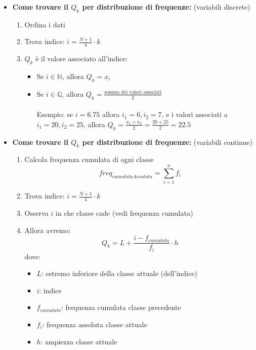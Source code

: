 \documentclass{article}  %
\theoremstyle{definition}
\begin{document}
\begin{itemize}
	\item \textbf{Come trovare il $Q_k$ per distribuzione di frequenze:} (variabili discrete)
	      \begin{enumerate}
		      \item Ordina i dati
		      \item Trova indice: $i=\frac{N+1}{4}\cdot k$
		      \item $Q_k$ è il valore associato all'indice:
		            \begin{itemize}
			            \item Se $i \in \mathbb{N}$, allora $Q_k=x_i$
			            \item Se $i \in \mathbb{Q}$, allora $Q_k=\frac{\text{somma dei valori associati}}{2}$ \\ \\
			                  Esempio: se $i=6.75$ allora $i_1=6, i_2=7$, e i valori associati a $i_1=20, i_2=25$, allora $Q_k=\frac{x_1+x_2}{2}=\frac{20+25}{2}=22.5$
		            \end{itemize}
	      \end{enumerate}
	\item \textbf{Come trovare il $Q_k$ per distribuzione di frequenze:} (variabili continue)
	      \begin{enumerate}
		      \item Calcola frequenza cumulata di ogni classe
		            \[ freq_{cumulataAssoluta}= \sum_{i=1}^{n} f_i \]
		      \item Trova indice: $i=\frac{N+1}{4}\cdot k$
		      \item Osserva $i$ in che classe cade (vedi frequenza cumulata)
		      \item Allora avremo:
		            \[
			            Q_k = L + \frac{i - f_{cumulata}}{f_i}\cdot h
		            \]
		            dove:
		            \begin{itemize}
			            \item $L$: estremo inferiore della classe attuale (dell'indice)
			            \item $i$: indice
			            \item $f_{cumulata}$: frequenza cumulata classe precedente
			            \item $f_i$: frequenza assoluta classe attuale
			            \item $h$: ampiezza classe attuale
		            \end{itemize}
	      \end{enumerate}
\end{itemize}
\end{document}
